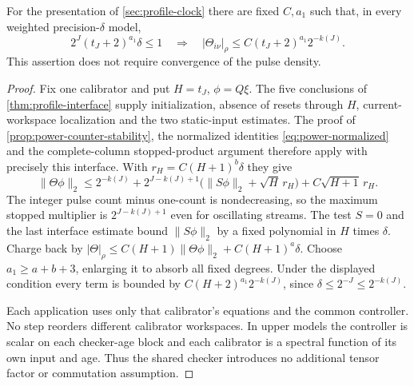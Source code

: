 \begin{lemma}\label{lem:profile-calibration}
For the presentation of \cref{sec:profile-clock} there are fixed $C,a_1$ such that, in every weighted precision-$\delta$ model,
\begin{equation}\label{eq:profile-calibration-bound}
 2^J(t_J+2)^{a_1}\delta\le1
 \quad\Longrightarrow\quad
 |\Theta_{i\nu}|_\rho\le C(t_J+2)^{a_1}2^{-k(J)}.
\end{equation}
This assertion does not require convergence of the pulse density.
\end{lemma}
\begin{proof}
Fix one calibrator and put $H=t_J$, $\phi=Q\xi$. The five conclusions of \cref{thm:profile-interface} supply initialization, absence of resets through $H$, current-workspace localization and the two static-input estimates. The proof of \cref{prop:power-counter-stability}, the normalized identities \eqref{eq:power-normalized} and the complete-column stopped-product argument therefore apply with precisely this interface. With $r_H=C(H+1)^b\delta$ they give
\[
 \|\Theta\phi\|_2\le2^{-k(J)}+
 2^{J-k(J)+1}\bigl(\|S\phi\|_2+\sqrt H\,r_H\bigr)
 +C\sqrt{H+1}\,r_H.
\]
The integer pulse count minus one-count is nondecreasing, so the maximum stopped multiplier is $2^{J-k(J)+1}$ even for oscillating streams. The test $S=0$ and the last interface estimate bound $\|S\phi\|_2$ by a fixed polynomial in $H$ times $\delta$. Charge back by $|\Theta|_\rho\le C(H+1)\|\Theta\phi\|_2+C(H+1)^a\delta$. Choose $a_1\ge a+b+3$, enlarging it to absorb all fixed degrees. Under the displayed condition every term is bounded by $C(H+2)^{a_1}2^{-k(J)}$, since $\delta\le2^{-J}\le2^{-k(J)}$.

Each application uses only that calibrator's equations and the common controller. No step reorders different calibrator workspaces. In upper models the controller is scalar on each checker-age block and each calibrator is a spectral function of its own input and age. Thus the shared checker introduces no additional tensor factor or commutation assumption.
\end{proof}

